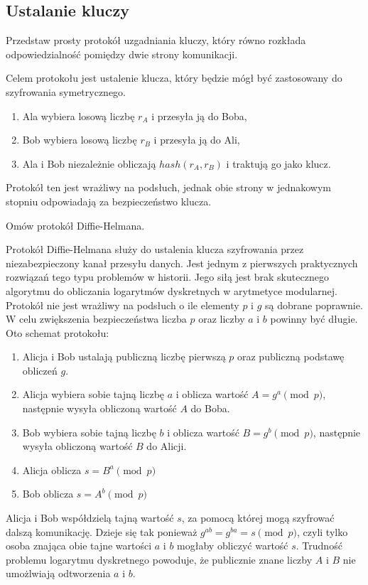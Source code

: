 \documentclass[answers,11pt]{exam}
\begin{document}
\subsection{Ustalanie kluczy}
\begin{questions}

\question Przedstaw prosty protokół uzgadniania kluczy, który równo rozkłada odpowiedzialność pomiędzy dwie strony komunikacji.
\begin{solution}
Celem protokołu jest ustalenie klucza, który będzie mógł być zastosowany do szyfrowania symetrycznego. 
\begin{enumerate}
\item Ala wybiera losową liczbę $r_A$ i przesyła ją do Boba,
\item Bob wybiera losową liczbę $r_B$ i przesyła ją do Ali,
\item Ala i Bob niezależnie obliczają $hash(r_A, r_B)$ i traktują go jako klucz.
\end{enumerate}
Protokół ten jest wrażliwy na podsłuch, jednak obie strony w jednakowym stopniu odpowiadają za bezpieczeństwo klucza.
\end{solution}

\question Omów protokół Diffie-Helmana.
\begin{solution}
Protokół Diffie-Helmana służy do ustalenia klucza szyfrowania przez niezabezpieczony kanał przesyłu danych. Jest jednym z pierwszych praktycznych rozwiązań tego typu problemów w historii. Jego siłą jest brak skutecznego algorytmu do obliczania logarytmów dyskretnych w arytmetyce modularnej. Protokół nie jest wrażliwy na podsłuch o ile elementy $p$ i $g$ są dobrane poprawnie. W celu zwiększenia bezpieczeństwa liczba $p$ oraz liczby $a$ i $b$ powinny być długie. Oto schemat protokołu:
\begin{enumerate}
\item Alicja i Bob ustalają publiczną liczbę pierwszą $p$ oraz publiczną podstawę obliczeń $g$.
\item Alicja wybiera sobie tajną liczbę $a$ i oblicza wartość $A=g^{a} \pmod{p}$, następnie wysyła obliczoną wartość $A$ do Boba.
\item Bob wybiera sobie tajną liczbę $b$ i oblicza wartość $B=g^{b} \pmod{p}$, następnie wysyła obliczoną wartość $B$ do Alicji.
\item Alicja oblicza $s=B^{a} \pmod{p}$
\item Bob oblicza $s=A^{b} \pmod{p}$
\end{enumerate}
Alicja i Bob współdzielą tajną wartość $s$, za pomocą której mogą szyfrować dalszą komunikację. Dzieje się tak ponieważ $g^{ab}=g^{ba}=s \pmod{p}$, czyli tylko osoba znająca obie tajne wartości $a$ i $b$ mogłaby obliczyć wartość $s$. Trudność problemu logarytmu dyskretnego powoduje, że publicznie znane liczby $A$ i $B$ nie umożlwiają odtworzenia $a$ i $b$.
\end{solution}


\end{questions}
\end{document}
